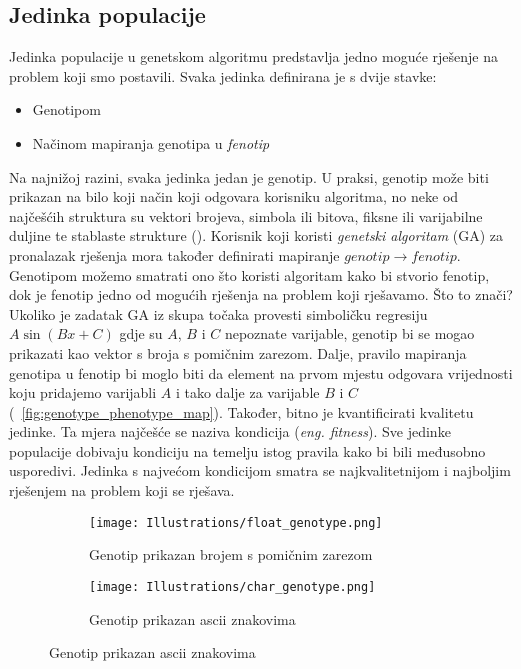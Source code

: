 \subsection{Jedinka populacije}
Jedinka populacije u genetskom algoritmu predstavlja jedno moguće rješenje na problem koji smo postavili.
Svaka jedinka definirana je s dvije stavke:
\begin{itemize}
	\item{Genotipom}
	\item{Načinom mapiranja genotipa u \emph{fenotip}}
\end{itemize}
Na najnižoj razini, svaka jedinka jedan je genotip. 
U praksi, genotip može biti prikazan na bilo koji način koji odgovara korisniku algoritma, no neke od najčešćih struktura su vektori brojeva, simbola ili bitova, fiksne ili varijabilne duljine te stablaste strukture (\cite{naturally_selecting_algorithms}).
Korisnik koji koristi \emph{genetski algoritam} (GA) za pronalazak rješenja mora također definirati mapiranje $genotip \rightarrow fenotip$.
Genotipom možemo smatrati ono što koristi algoritam kako bi stvorio fenotip, dok je fenotip jedno od mogućih rješenja na problem koji rješavamo.
Što to znači?
Ukoliko je zadatak GA iz skupa točaka provesti simboličku regresiju $A\sin(Bx + C)$ gdje su $A$, $B$ i $C$ nepoznate varijable, genotip bi se mogao prikazati kao vektor s broja s pomičnim zarezom.
Dalje, pravilo mapiranja genotipa u fenotip bi moglo biti da element na prvom mjestu odgovara vrijednosti koju pridajemo varijabli $A$ i tako dalje za varijable $B$ i $C$ (~\ref{fig:genotype_phenotype_map}).
Također, bitno je kvantificirati kvalitetu jedinke.
Ta mjera najčešće se naziva kondicija (\emph{eng. fitness}).
Sve jedinke populacije dobivaju kondiciju na temelju istog pravila kako bi bili međusobno usporedivi.
Jedinka s najvećom kondicijom smatra se najkvalitetnijom i najboljim rješenjem na problem koji se rješava.

\begin{figure}
	\caption{Mogućnosti spremanja i korištenja genotipa tijekom izvođenja genetskog algoritma}
	\begin{subfigure}[t]{0.45\textwidth}
		\texttt{[image: Illustrations/float\_genotype.png]}
		\caption{Genotip prikazan brojem s pomičnim zarezom}
	\end{subfigure}
	\hspace{\fill}
	\begin{subfigure}[t]{0.45\textwidth}
		\texttt{[image: Illustrations/char\_genotype.png]}
		\caption{Genotip prikazan ascii znakovima}
	\end{subfigure}
	\label{fig:genotype_types}
\end{figure}

